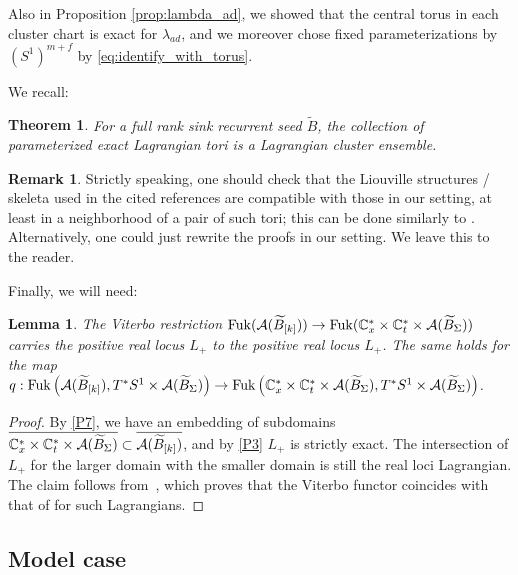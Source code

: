 \documentclass[12pt, letter]{amsart}
\DeclareMathOperator{\Fuk}{Fuk}
\newtheorem{lemma}[dummy]{Lemma}
\newtheorem{theorem}[dummy]{Theorem}
\theoremstyle{definition}
\newtheorem{remark}[dummy]{Remark}
\begin{document}
Also in Proposition \ref{prop:lambda_ad}, we showed that the central torus in each cluster chart is exact for $\lambda_{ad}$, and we moreover chose fixed parameterizations by $(S^1)^{m+f}$ by 
\eqref{eq:identify_with_torus}. 

We recall: 

\begin{theorem} \label{thm: compact cluster}
    \cite{PT, GLe} For a full rank sink recurrent seed $\widetilde{B}$, the collection of parameterized exact Lagrangian tori 
    is a Lagrangian cluster ensemble. 
\end{theorem}

\begin{remark}
    Strictly speaking, one should check that the Liouville structures / skeleta used in the cited references are compatible with those in our setting, at least in a neighborhood of a pair of such tori; this can be done similarly to \cite[Sec. 4.7]{PT}.  Alternatively, one could just rewrite the proofs in our setting.  We leave this to the reader.
\end{remark}


Finally, we will need: 

\begin{lemma}\label{lem: viterbo respects positive}
    The Viterbo restriction $\Fuk(\cA( \widetilde B_{[k]})) 
     \to \Fuk( \bC_x^* \times  \bC^*_t \times \cA(\widetilde B_\Sigma ) )$ carries the positive real locus $L_+$ to the positive real locus $L_+$.  The same holds for the map $q: \Fuk\left( \cA( \widetilde B_{[k]}), T^*S^1 \times \cA(\widetilde B_\Sigma) \right) \to \Fuk \left(\bC_x^* \times  \bC^*_t \times \cA(\widetilde B_\Sigma ) , T^*S^1 \times \cA(\widetilde B_\Sigma) \right)$.
\end{lemma}
\begin{proof}
    By \ref{P7},  we have an embedding of subdomains \( \overline{\mathbb{C}_x^* \times  \mathbb{C}^*_t \times \mathcal{A}(\widetilde B_\Sigma )} \subset \overline{\mathcal{A}( \widetilde B_{[k]})} \), and by \ref{P3} \(L_+\) is strictly exact.  The intersection of \(L_+\) for the larger domain with the smaller domain is still the real loci Lagrangian. 
    The claim follows from~\cite[Section 2.6]{Sy}, which proves that the \cite{GPS2} Viterbo functor coincides with that of \cite[Section 4.11]{AbouzaidSeidel} for such Lagrangians. 
\end{proof}



\subsection{Model case}
\end{document}
